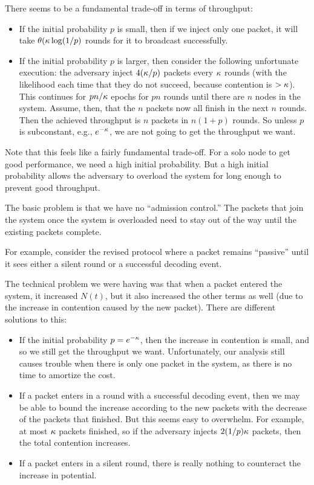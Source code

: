 There seems to be a fundamental trade-off in terms of throughput:
\begin{itemize}
    \item If the initial probability $p$ is small, then if we inject only one packet, it will take $\theta(\kappa \log(1/p)$ rounds for it to broadcast successfully.  
    \item If the initial probability $p$ is larger, then consider the following unfortunate execution: the adversary inject $4(\kappa/p)$ packets every $\kappa$ rounds (with the likelihood each time that they do not succeed, because contention is $> \kappa$).  This continues for $pn/\kappa$ epochs for $pn$ rounds until there are $n$ nodes in the system.  Assume, then, that the $n$ packets now all finish in the next $n$ rounds.  Then the achieved throughput is $n$ packets in $n(1 + p)$ rounds.  So unless $p$ is subconstant, e.g., $e^{-\kappa}$, we are not going to get the throughput we want.
\end{itemize}
Note that this feels like a fairly fundamental trade-off.  For a solo node to get good performance, we need a high initial probability.  But a high initial probability allows the adversary to overload the system for long enough to prevent good throughput.  

The basic problem is that we have no ``admission control.'' The packets that join the system once the system is overloaded need to stay out of the way until the existing packets complete.

For example, consider the revised protocol where a packet remains ``passive'' until it sees either a silent round or a successful decoding event.

The technical problem we were having was that when a packet entered the system, it increased $N(t)$, but it also increased the other terms as well (due to the increase in contention caused by the new packet).  There are different solutions to this:
\begin{itemize}
    \item If the initial probability $p = e^{-\kappa}$, then the increase in contention is small, and so we still get the throughput we want.  Unfortunately, our analysis still causes trouble when there is only one packet in the system, as there is no time to amortize the cost.
    \item If a packet enters in a round with a successful decoding event, then we may be able to bound the increase according to the new packets with the decrease of the packets that finished.  But this seems easy to overwhelm.  For example, at most $\kappa$ packets finished, so if the adversary injects $2(1/p)\kappa$ packets, then the total contention increases.
    \item If a packet enters in a silent round, there is really nothing to counteract the increase in potential.  
\end{itemize}

